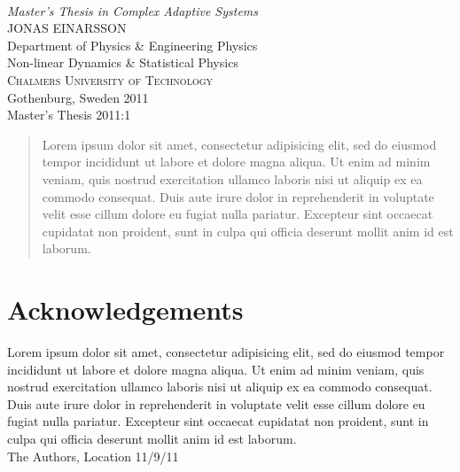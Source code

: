 
\begin{titlepage}

\mbox{}
\vfill
\addtolength{\voffset}{2cm}
\begin{flushleft}
	{ \\[0.5cm]
	\emph{\Large Master's Thesis in Complex Adaptive Systems} \\[.8cm]
	
	{\huge JONAS EINARSSON}\\[.8cm]
	
	{\Large Department of Physics \& Engineering Physics \\
	Non-linear Dynamics \& Statistical Physics \\
	\textsc{Chalmers University of Technology} \\
	Gothenburg, Sweden 2011 \\
	Master's Thesis 2011:1\\
	} 
	}
\end{flushleft}

\end{titlepage}
\ClearShipoutPicture

\pagestyle{empty}
\newpage
\clearpage
\mbox{}
\newpage
\clearpage
\thispagestyle{empty}

\begin{abstract}
Lorem ipsum dolor sit amet, consectetur adipisicing elit, sed do eiusmod tempor incididunt ut labore et dolore magna aliqua. Ut enim ad minim veniam, quis nostrud exercitation ullamco laboris nisi ut aliquip ex ea commodo consequat. Duis aute irure dolor in reprehenderit in voluptate velit esse cillum dolore eu fugiat nulla pariatur. Excepteur sint occaecat cupidatat non proident, sunt in culpa qui officia deserunt mollit anim id est laborum.
\end{abstract}

\newpage
\clearpage
\mbox{}
\newpage
\clearpage
\thispagestyle{empty}
\section*{Acknowledgements}
Lorem ipsum dolor sit amet, consectetur adipisicing elit, sed do eiusmod tempor incididunt ut labore et dolore magna aliqua. Ut enim ad minim veniam, quis nostrud exercitation ullamco laboris nisi ut aliquip ex ea commodo consequat. Duis aute irure dolor in reprehenderit in voluptate velit esse cillum dolore eu fugiat nulla pariatur. Excepteur sint occaecat cupidatat non proident, sunt in culpa qui officia deserunt mollit anim id est laborum. \\[1cm]

\hfill The Authors, Location 11/9/11
\newpage
\clearpage
\mbox{}
